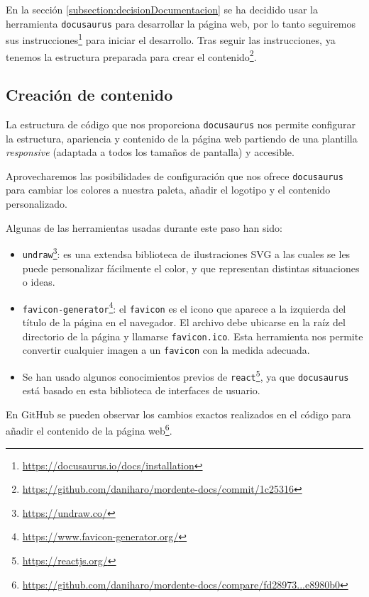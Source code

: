 En la sección \ref{subsection:decisionDocumentacion} se ha decidido usar la herramienta \texttt{docusaurus} para desarrollar la página web, por lo tanto seguiremos sus instrucciones\footnote{\url{https://docusaurus.io/docs/installation}} para iniciar el desarrollo. Tras seguir las instrucciones, ya tenemos la estructura preparada para crear el contenido\footnote{\url{https://github.com/daniharo/mordente-docs/commit/1c25316}}.

\subsection{Creación de contenido}

La estructura de código que nos proporciona \texttt{docusaurus} nos permite configurar la estructura, apariencia y contenido de la página web partiendo de una plantilla \textit{responsive} (adaptada a todos los tamaños de pantalla) y accesible.

Aprovecharemos las posibilidades de configuración que nos ofrece \texttt{docusaurus} para cambiar los colores a nuestra paleta, añadir el logotipo y el contenido personalizado.

Algunas de las herramientas usadas durante este paso han sido:
\begin{itemize}
    \item \texttt{undraw}\footnote{\url{https://undraw.co/}}: es una extendsa biblioteca de ilustraciones SVG a las cuales se les puede personalizar fácilmente el color, y que representan distintas situaciones o ideas.
    \item \texttt{favicon-generator}\footnote{\url{https://www.favicon-generator.org/}}: el \texttt{favicon} es el icono que aparece a la izquierda del título de la página en el navegador. El archivo debe ubicarse en la raíz del directorio de la página y llamarse \texttt{favicon.ico}. Esta herramienta nos permite convertir cualquier imagen a un \texttt{favicon} con la medida adecuada.
    \item Se han usado algunos conocimientos previos de \texttt{react}\footnote{\url{https://reactjs.org/}}, ya que \texttt{docusaurus} está basado en esta biblioteca de interfaces de usuario.
\end{itemize}

En GitHub se pueden observar los cambios exactos realizados en el código para añadir el contenido de la página web\footnote{\url{https://github.com/daniharo/mordente-docs/compare/fd28973...e8980b0}}.



